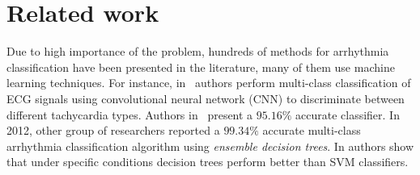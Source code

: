 \section{Related work}
\label{sec:related}

Due to high importance of the problem, hundreds of methods for 
arrhythmia classification have been presented in the literature, 
many of them use machine learning techniques. 
For instance, in~\cite{jun2018ecg} authors perform multi-class 
classification of 
ECG signals using convolutional neural network (CNN) to discriminate 
between different tachycardia types. 
Authors in~\cite{assadi2015arrhythmias} present a $95.16\%$ accurate 
\knn classifier.
In 2012, other group of researchers reported a $99.34\%$ accurate 
multi-class arrhythmia classification algorithm using 
\textit{ensemble decision trees}. 
In \cite{mohanty2018ventricular} authors show that under specific 
conditions decision trees perform better than SVM classifiers.  







